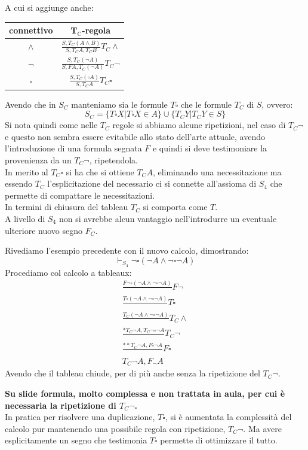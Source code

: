 \documentclass[a4paper,12pt, oneside]{book}
\begin{document}
A cui si aggiunge anche:
\begin{table}[H]
  \Large
  \centering
  \begin{tabular}{c||c}
    connettivo& T$_{\mbox{C}}$-regola\\
    \hline
    \hline
    $\land$ & $\frac{S,T_C(A\land B)}{S,T_CA,T_CB}T_C\land$\\
    \hline
    $\neg$ & $\frac{S,T_C(\neg A)}{S,FA,T_C(\neg A)}T_C\neg$\\
    \hline
    $\square$ & $\frac{S,T_C(\square A)}{S,T_CA}T_C\square$
  \end{tabular}
\end{table}
Avendo che in $S_C$ manteniamo sia le formule $T\square$ che le formule $T_C$ di
$S$, ovvero:
\[S_C=\{T\square X|T\square X\in A\}\cup\{T_CY|T_CY\in S\}\]
Si nota quindi come nelle $T_C$ regole si abbiamo alcune ripetizioni, nel caso
di $T_C\neg$ e questo non sembra essere evitabile allo stato dell'arte
attuale, avendo l'introduzione di una formula segnata $F$ e quindi si deve
testimoniare la provenienza da un $T_C\neg$, ripetendola.\\
In merito al $T_C\square$ si ha che si ottiene $T_CA$, eliminando una
necessitazione ma essendo $T_C$ l'esplicitazione del necessario ci si connette
all'assioma di $S_4$ che permette di compattare le necessitazioni.\\
In termini di chiusura del tableau $T_C$ si comporta come $T$.\\
A livello di $S_4$ non si avrebbe alcun vantaggio nell'introdurre un eventuale
ulteriore nuovo segno $F_C$.
\begin{esempio}
  Rivediamo l'esempio precedente con il nuovo calcolo, dimostrando:
  \[\vdash_{S_4}\neg\square(\neg A\land \neg \square\neg A)\]
  Procediamo col calcolo a tableaux:
  \begin{gather*}
    \frac{F\neg\square(\neg A\land \neg \square\neg A)}{}F\neg\\
    \frac{T\square(\neg A\land \neg \square\neg A)}{}T\square\\
    \frac{T_C(\neg A\land \neg \square\neg A)}{}T_C\land\\
    \frac{*T_C\neg A, T_C\neg\square\neg A}{}T_C\neg\\
    \frac{**T_C\neg A, F\square\neg A}{}F\square\\
    T_C\neg A,F_\neg A
  \end{gather*}
  Avendo che il tableau chiude, per di più anche senza la ripetizione del
  $T_C\neg$. 
\end{esempio}
\noindent
\textbf{Su slide formula, molto complessa e non trattata in aula, per cui è
  necessaria la ripetizione di $T_C\neg$.} \\
In pratica per risolvere una duplicazione, $T\square$, si è aumentata la
complessità del calcolo pur mantenendo una possibile regola con ripetizione,
$T_C\neg$. Ma avere esplicitamente un segno che testimonia $T\square$ permette
di ottimizzare il tutto.
\end{document}
